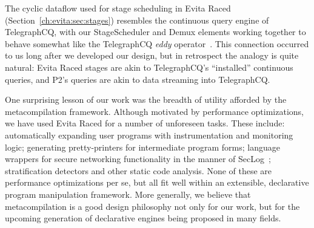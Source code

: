 The cyclic dataflow used for stage scheduling in Evita Raced
(Section~\ref{ch:evita:sec:stages}) resembles the continuous query engine of
TelegraphCQ, with our StageScheduler and Demux elements working together to
behave somewhat like the TelegraphCQ {\em eddy} operator~\cite{tcq-cidr}.  This
connection occurred to us long after we developed our design, but in retrospect
the analogy is quite natural: Evita Raced stages are akin to TelegraphCQ's
``installed'' continuous queries, and P2's \OVERLOG queries are akin to data
streaming into TelegraphCQ.

One surprising lesson of our work was the breadth of utility afforded by the
metacompilation framework.  Although motivated by performance optimizations, we
have used Evita Raced for a number of unforeseen tasks.  These include:
automatically expanding user programs with instrumentation and monitoring
logic; generating pretty-printers for intermediate program forms; language
wrappers for secure networking functionality in the manner of
SecLog~\cite{abadi-netdb07}; stratification detectors and other static code
analysis.  None of these are performance optimizations per se, but all fit well
within an extensible, declarative program manipulation framework.  More
generally, we believe that metacompilation is a good design philosophy not only
for our work, but for the upcoming generation of declarative engines being
proposed in many fields.


